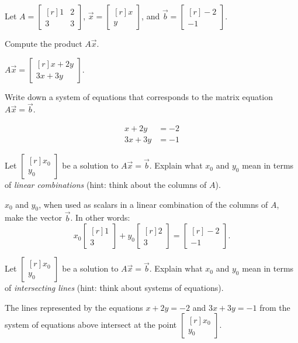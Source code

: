 \documentclass{problemset}
\newcommand{\mat}[1]{\begin{bmatrix*}[r]#1\end{bmatrix*}}
\begin{document}
	\question
	Let $A=\mat{1&2\\3&3}$, $\vec x=\mat{x\\y}$, and $\vec b=\mat{-2\\-1}$.
	\begin{parts}
		\item Compute the product $A\vec x$.
			\begin{solution}
				$A \vec x = \mat{x+2y\\3x+3y}$.
			\end{solution}
		\item Write down a system of equations that corresponds to the matrix equation
			$A\vec x=\vec b$.
			\begin{solution}
				\begin{align*}
					x + 2y &= -2 \\
					3x + 3y &= -1
				\end{align*}
			\end{solution}
		\item Let $\mat{x_0\\y_0}$ be a solution to $A\vec x=\vec b$. Explain what
			$x_0$ and $y_0$ mean in terms of \emph{linear combinations} (hint: think
			about the columns of $A$).
			\begin{solution}
				$x_0$ and $y_0$, when used as scalars in a linear combination of
				the columns of $A$, make the vector $\vec b$. In other words:
				\[
					x_0 \mat{1\\3} + y_0 \mat{2\\3} = \mat{-2\\-1}.
				\]
			\end{solution}
		\item Let $\mat{x_0\\y_0}$ be a solution to $A\vec x=\vec b$. Explain what
			$x_0$ and $y_0$ mean in terms of \emph{intersecting lines} (hint: think
			about systems of equations).
			\begin{solution}
				The lines represented by the equations $x+2y=-2$ and $3x+3y=-1$
				from the system of equations above intersect at the point $\mat{x_0\\y_0}$.
			\end{solution}
	\end{parts}
\end{document}
